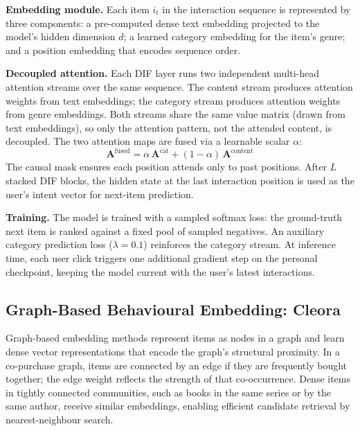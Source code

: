 \textbf{Embedding module.}
Each item $i_t$ in the interaction sequence is represented by three components: a pre-computed dense text embedding projected to the model's hidden dimension $d$; a learned category embedding for the item's genre; and a position embedding that encodes sequence order.

\textbf{Decoupled attention.}
Each DIF layer runs two independent multi-head attention streams over the same sequence.
The content stream produces attention weights from text embeddings; the category stream produces attention weights from genre embeddings.
Both streams share the same value matrix (drawn from text embeddings), so only the attention pattern, not the attended content, is decoupled.
The two attention maps are fused via a learnable scalar $\alpha$:
\begin{equation}
  \mathbf{A}^{\text{fused}} = \alpha\,\mathbf{A}^{\text{cat}} + (1 - \alpha)\,\mathbf{A}^{\text{content}}
\end{equation}
The causal mask ensures each position attends only to past positions.
After $L$ stacked DIF blocks, the hidden state at the last interaction position is used as the user's intent vector for next-item prediction.

\textbf{Training.}
The model is trained with a sampled softmax loss: the ground-truth next item is ranked against a fixed pool of sampled negatives.
An auxiliary category prediction loss ($\lambda = 0.1$) reinforces the category stream.
At inference time, each user click triggers one additional gradient step on the personal checkpoint, keeping the model current with the user's latest interactions.

\subsection{Graph-Based Behavioural Embedding: Cleora}
\label{sec:cleora}

Graph-based embedding methods represent items as nodes in a graph and learn dense vector representations that encode the graph's structural proximity.
In a co-purchase graph, items are connected by an edge if they are frequently bought together; the edge weight reflects the strength of that co-occurrence.
Dense items in tightly connected communities, such as books in the same series or by the same author, receive similar embeddings, enabling efficient candidate retrieval by nearest-neighbour search.

